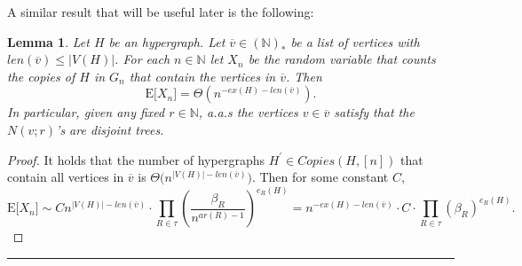 \documentclass[12pt,notitlepage,a4paper]{article}
\newtheorem{lemma}{Lemma}[section]
\theoremstyle{definition}
\newcommand{\N}{\mathbb{N}}
\newcommand{\sep}{\noindent\rule{2cm}{0.4pt}}
\begin{document}
A similar result that will be useful later is the following:

%
%

\begin{lemma}\label{lem:nocopiesfixed}
	Let $H$ be an hypergraph. Let
	$\overline{v}\in (\N)_*$ be a list of vertices
	with $len(\overline{v})\leq |V(H)|$.
	For each $n\in \N$ 
	let $X_n$ be the random variable that
	counts the copies of $H$ in $G_n$ that contain the vertices
	in $\overline{v}$. Then
	\[
	\mathrm{E}\big[ X_n \big]=\Theta(n^{-ex(H)-len(\overline{v})}).\]
	In particular, given any fixed $r\in \N$,
	a.a.s the vertices $v\in \overline{v}$ satisfy that
	the $N(v;r)$'s are disjoint trees.	
\end{lemma}
\begin{proof}
	It holds that the number of hypergraphs $H^\prime \in Copies(H,[n])$
	that contain all vertices in $\overline{v}$ is
	 $\Theta\big(n^{|V(H)|-len(\overline{v})}\big)$. Then for
	 some constant $C$,
	\[
	\mathrm{E}\big[ X_n \big]\sim 
	C n^{|V(H)|-len(\overline{v})}
	\cdot\prod_{R\in\tau} \left( \frac{\beta_R}{n^{ar(R)-1}}\right)^{e_R(H)}=
	n^{-ex(H)-len(\overline{v})}\cdot C \cdot
	\prod_{R\in\tau} \left( \beta_R \right)^{e_R(H)}.
	\]
\end{proof}
\sep
\end{document}
